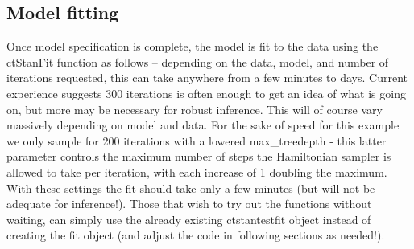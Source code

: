 \documentclass[nojss]{jss}\usepackage[]{graphicx}\usepackage[]{color}
\begin{document}
\subsection{Model fitting}
Once model specification is complete, the model is fit to the data using the ctStanFit function as follows -- depending on the data, model, and number of iterations requested, this can take anywhere from a few minutes to days. Current experience suggests 300 iterations is often enough to get an idea of what is going on, but more may be necessary for robust inference. This will of course vary massively depending on model and data. For the sake of speed for this example we only sample for 200 iterations with a lowered max\_treedepth - this latter parameter controls the maximum number of steps the Hamiltonian sampler is allowed to take per iteration, with each increase of 1 doubling the maximum. With these settings the fit should take only a few minutes (but will not be adequate for inference!). Those that wish to try out the functions without waiting, can simply use the already existing ctstantestfit object instead of creating the fit object (and adjust the code in following sections as needed!).
\end{document}
